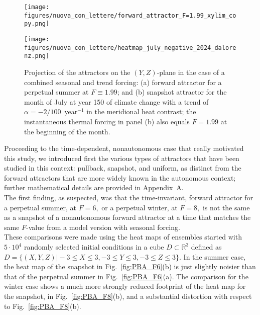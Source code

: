 \documentclass[%
 aip, cha,
 amsmath,amssymb,
 reprint,%
author-year,%
]{revtex4-1}
\newcommand{\0}{\mathbf 0}
\begin{document}
\begin{figure*}
	\begin{minipage}{0.45\textwidth}
		\centering
		\texttt{[image: figures/nuova\_con\_lettere/forward\_attractor\_F=1.99\_xylim\_copy.png]}
	\end{minipage}%
	\begin{minipage}{0.45\textwidth}
		\centering
		\texttt{[image: figures/nuova\_con\_lettere/heatmap\_july\_negative\_2024\_dalorenz.png]}
	\end{minipage}
	\caption{Projection of the attractors on the $(Y, Z)$-plane in the case of a combined seasonal and trend forcing: (a) forward attractor for a perpetual summer at $F \equiv 1.99$; and (b) snapshot attractor for the month of July at year 150 of climate change with a trend of $\alpha = - 2/100$~year$^{-1}$ in the meridional heat contrast; the instantaneous thermal forcing in panel (b) also equals $F = 1.99$ at the beginning of the month. }
	\label{fig:PBA_F199} 
\end{figure*}
Proceeding to the time-dependent, nonautonomous case that really motivated this study, we introduced first the various types of attractors that have been studied in this context: pullback, snapshot, and uniform, as distinct from the forward attractors that are more widely known in the autonomous context; further mathematical details are provided in Appendix~A. \\
The first finding, as suspected, was that the time-invariant, forward attractor for a perpetual summer, at $F=6,$ or a perpetual winter, at $F=8,$ is not the same as a snapshot of a nonautonomous forward attractor at a time that matches the same $F$-value from a model version with seasonal forcing. \\
These comparisons were made using the heat maps of ensembles started with $5 \cdot 10^4$ randomly selected initial conditions in a cube $D \subset \mathbb{R}^3$ defined as $D = \{(X,Y,Z) \vert -3  \le X \le 3, -3 \le Y \le 3, -3 \le Z \le 3 \}.$ In the summer case, the heat map of the snapshot in Fig.~\ref{fig:PBA_F6}(b) is just slightly noisier than that of the perpetual summer in Fig.~\ref{fig:PBA_F6}(a). The comparison for the winter case shows a much more strongly reduced footprint of the heat map for the snapshot, in Fig.~\ref{fig:PBA_F8}(b), and a substantial distortion with respect to  Fig.~\ref{fig:PBA_F8}(b). \\
\end{document}
